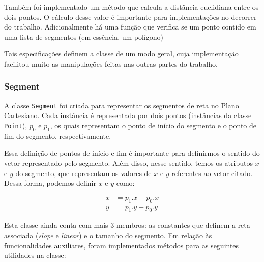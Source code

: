 \documentclass{article}
\begin{document}
Também foi implementado um método que calcula a distância euclidiana entre os dois pontos. O cálculo desse valor é importante para implementações no decorrer do trabalho. Adicionalmente há uma função que verifica se um ponto contido em uma lista de segmentos (em essência, um polígono)

Tais especificações definem a classe de um modo geral, cuja implementação facilitou muito as manipulações feitas nas outras partes do trabalho.

\subsubsection{Segment}

A classe \texttt{Segment} foi criada para representar os segmentos de reta no Plano Cartesiano. Cada instância é representada por dois pontos (instâncias da classe \texttt{Point}), \( p_0 \) e \( p_1 \), os quais representam o ponto de início do segmento e o ponto de fim do segmento, respectivamente.

Essa definição de pontos de início e fim é importante para definirmos o sentido do vetor representado pelo segmento. Além disso, nesse sentido, temos os atributos \( x \) e \( y \) do segmento, que representam os valores de \( x \) e \( y \) referentes ao vetor citado. Dessa forma, podemos definir \( x \) e \( y \) como:

\begin{align*}
	x & = p_1.x - p_0.x \\
	y & = p_1.y - p_0.y
\end{align*}

Esta classe ainda conta com mais 3 membros: as constantes que definem a reta associada (\textit{slope} e \textit{linear}) e o tamanho do segmento. Em relação às funcionalidades auxiliares, foram implementados métodos para as seguintes utilidades na classe:
\end{document}
